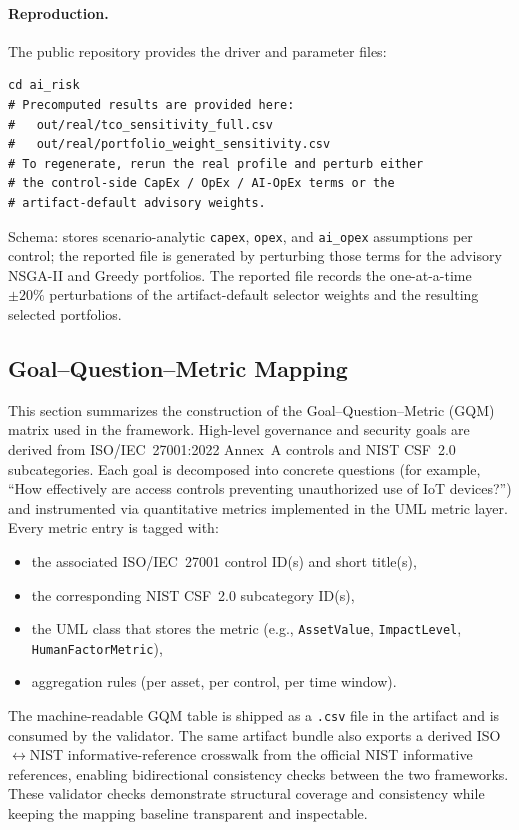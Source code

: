 \documentclass[preprint,12pt]{elsarticle}
\begin{document}
\paragraph{Reproduction.} The public repository provides the driver and parameter files:
\begin{verbatim}
cd ai_risk
# Precomputed results are provided here:
#   out/real/tco_sensitivity_full.csv
#   out/real/portfolio_weight_sensitivity.csv
# To regenerate, rerun the real profile and perturb either
# the control-side CapEx / OpEx / AI-OpEx terms or the
# artifact-default advisory weights.
\end{verbatim}
Schema:  stores scenario-analytic \texttt{capex}, \texttt{opex}, and \texttt{ai\_opex} assumptions per control; the reported  file is generated by perturbing those terms for the advisory NSGA-II and Greedy portfolios. The reported  file records the one-at-a-time $\pm 20\%$ perturbations of the artifact-default selector weights and the resulting selected portfolios.


\subsection{Goal--Question--Metric Mapping}
\label{sec:gqm}

This section summarizes the construction of the Goal--Question--Metric (GQM) matrix used in the framework. High-level governance and security goals are derived from ISO/IEC~27001:2022 Annex~A controls and NIST CSF~2.0 subcategories. Each goal is decomposed into concrete questions (for example, ``How effectively are access controls preventing unauthorized use of IoT devices?'') and instrumented via quantitative metrics implemented in the UML metric layer. Every metric entry is tagged with:
\begin{itemize}[leftmargin=*]
  \item the associated ISO/IEC~27001 control ID(s) and short title(s),
  \item the corresponding NIST CSF~2.0 subcategory ID(s),
  \item the UML class that stores the metric (e.g., \texttt{AssetValue}, \texttt{ImpactLevel}, \texttt{HumanFactorMetric}),
  \item aggregation rules (per asset, per control, per time window).
\end{itemize}
The machine-readable GQM table is shipped as a \texttt{.csv} file in the artifact and is consumed by the validator. The same artifact bundle also exports a derived ISO$\leftrightarrow$NIST informative-reference crosswalk from the official NIST informative references, enabling bidirectional consistency checks between the two frameworks. These validator checks demonstrate structural coverage and consistency while keeping the mapping baseline transparent and inspectable.
\end{document}
